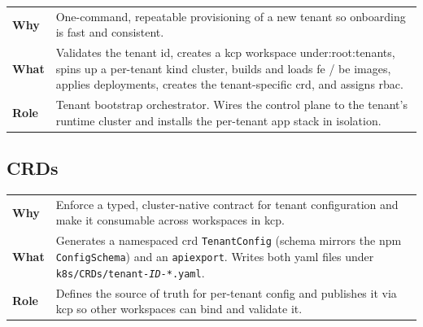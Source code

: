 \documentclass[11pt, a4paper, oneside, listof=totoc]{scrartcl}
\makeatletter
\newcommand{\codesummary}[3]{%
    \vspace{0.4\baselineskip}%
    \noindent\begin{tabularx}{\linewidth}{@{}>{\bfseries}l X@{}}
    Why  & #1\\
    What & #2\\
    Role & #3\\
    \end{tabularx}%
    \vspace{0.2\baselineskip}%
}
\makeatother
\begin{document}
                \codesummary
                    {One-command, repeatable provisioning of a new tenant so onboarding is fast and consistent.}
                    {Validates the tenant id, creates a \gls{kcp} workspace under\@:root:tenants, spins up a per-tenant kind cluster, builds and loads \gls{fe} / \gls{be} images, applies deployments, creates the tenant-specific \gls{crd}, and assigns \gls{rbac}.}
                    {Tenant bootstrap orchestrator. Wires the control plane to the tenant's runtime cluster and installs the per-tenant app stack in isolation.}

        \clearpage

            \subsection{CRDs}
                \codesummary
                    {Enforce a typed, cluster-native contract for tenant configuration and make it consumable across workspaces in \gls{kcp}.}
                    {Generates a namespaced \gls{crd} \texttt{TenantConfig} (schema mirrors the \gls{npm} \texttt{ConfigSchema}) and an \texttt{\gls{apiexport}}. Writes both \gls{yaml} files under \texttt{k8s/CRDs/tenant-\textit{ID}-*.yaml}.}
                    {Defines the source of truth for per-tenant config and publishes it via \gls{kcp} so other workspaces can bind and validate it.}
        \clearpage
\end{document}

